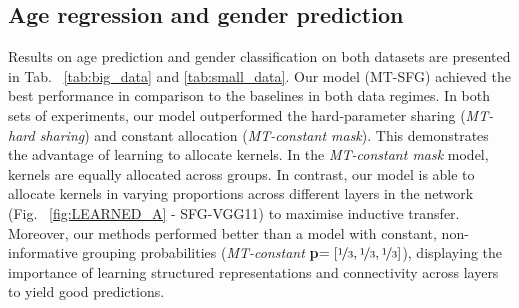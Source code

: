 \subsection{Age regression and gender prediction}

Results on age prediction and gender classification on both datasets are presented in Tab.~ \ref{tab:big_data} and \ref{tab:small_data}. Our model (MT-SFG) achieved the best performance in comparison to the baselines in both data regimes. In both sets of experiments, our model outperformed the hard-parameter sharing (\emph{MT-hard sharing}) and constant allocation (\emph{MT-constant mask}). This demonstrates the advantage of learning to allocate kernels. In the \emph{MT-constant mask} model, kernels are equally allocated across groups. In contrast, our model is able to allocate kernels in varying proportions across different layers in the network (Fig.~ \ref{fig:LEARNED_A} - SFG-VGG11) to maximise inductive transfer. Moreover, our methods performed better than a model with constant, non-informative grouping probabilities (\emph{MT-constant} \textbf{p}$= [\nicefrac{1}{3}, \nicefrac{1}{3}, \nicefrac{1}{3}]$), displaying the importance of learning structured representations and connectivity across layers to yield good predictions.


